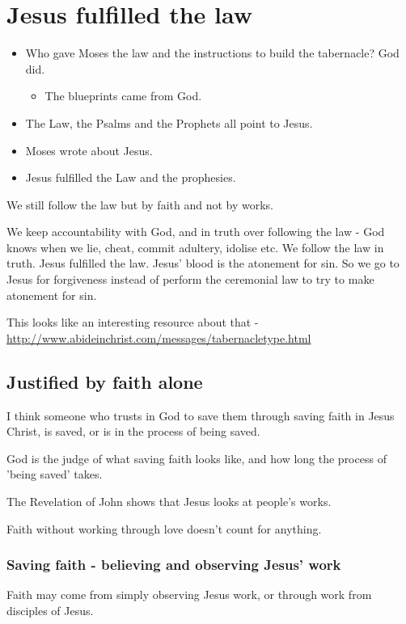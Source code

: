 \documentclass[11pt]{article}
\begin{document}
\section{Jesus fulfilled the law}
\label{sec:org97bd320}
\begin{itemize}
\item Who gave Moses the law and the instructions to build the tabernacle? God did.
\begin{itemize}
\item The blueprints came from God.
\end{itemize}
\item The Law, the Psalms and the Prophets all point to Jesus.
\item Moses wrote about Jesus.
\item Jesus fulfilled the Law and the prophesies.
\end{itemize}

We still follow the law but by faith and not by works.

We keep accountability with God, and in truth over following the law - God knows when we lie, cheat, commit adultery, idolise etc.
We follow the law in truth.
Jesus fulfilled the law. Jesus' blood is the atonement for sin.
So we go to Jesus for forgiveness instead of perform the ceremonial law to try to make atonement for sin.

This looks like an interesting resource about that - \url{http://www.abideinchrist.com/messages/tabernacletype.html}

\subsection{Justified by faith alone}
\label{sec:org60a8f47}
I think someone who trusts in God to save them through saving faith in Jesus Christ, is saved, or is in the process of being saved.

God is the judge of what saving faith looks like, and how long the process of 'being saved' takes.

The Revelation of John shows that Jesus looks at people's works.

Faith without working through love doesn't count for anything.

\subsubsection{Saving faith - believing and observing Jesus' work}
\label{sec:org0f1358c}
Faith may come from simply observing Jesus work, or through work from
disciples of Jesus.
\end{document}
